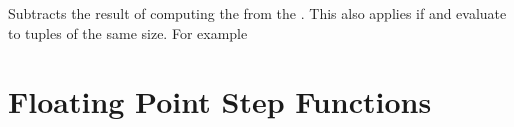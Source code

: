\documentclass[oneside]{book}
\begin{document}
\begin{function}{\FpSub}
\begin{syntax}
  
\end{syntax}
Subtracts the result of computing the  from the .
This also applies if  and  evaluate to tuples of the same size. For example
\begin{demohigh}
\FpSet {}
\FpSub {}
\FpUse \lTmpaFp
\end{demohigh}
\end{function}

\section{Floating Point Step Functions}

\end{document}
